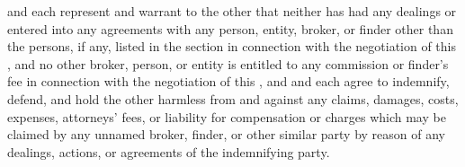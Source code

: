 \lessee and \lessor each represent and warrant to the other that neither has had any dealings or entered into any agreements with any person, entity, broker, or finder other than the persons, if any, listed in the \basicLeaseInformation  section in connection with the negotiation of this \lease, and no other broker, person, or entity is entitled to any commission or finder's fee in connection with the negotiation of this \lease, and \lessee and \lessor each agree to indemnify, defend, and hold the other harmless from and against any claims, damages, costs, expenses, attorneys' fees, or liability for compensation or charges which may be claimed by any unnamed broker, finder, or other similar party by reason of any dealings, actions, or agreements of the indemnifying party.
